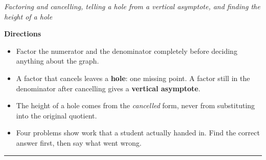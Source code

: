 \documentclass[12pt]{article}
\begin{document}

\begin{center}
\textit{Factoring and cancelling, telling a hole from a vertical asymptote, and finding the height of a hole}
\end{center}

\noindent\textbf{Directions}
\begin{itemize}[leftmargin=1.1cm, itemsep=1pt, topsep=3pt]
  \item Factor the numerator and the denominator completely before deciding anything about the graph.
  \item A factor that cancels leaves a \textbf{hole}: one missing point. A factor still in the denominator after cancelling gives a \textbf{vertical asymptote}.
  \item The height of a hole comes from the \emph{cancelled} form, never from substituting into the original quotient.
  \item Four problems show work that a student actually handed in. Find the correct answer first, then say what went wrong.
\end{itemize}

\vspace{0.2cm}
\noindent\rule{\linewidth}{0.4pt}




\end{document}
